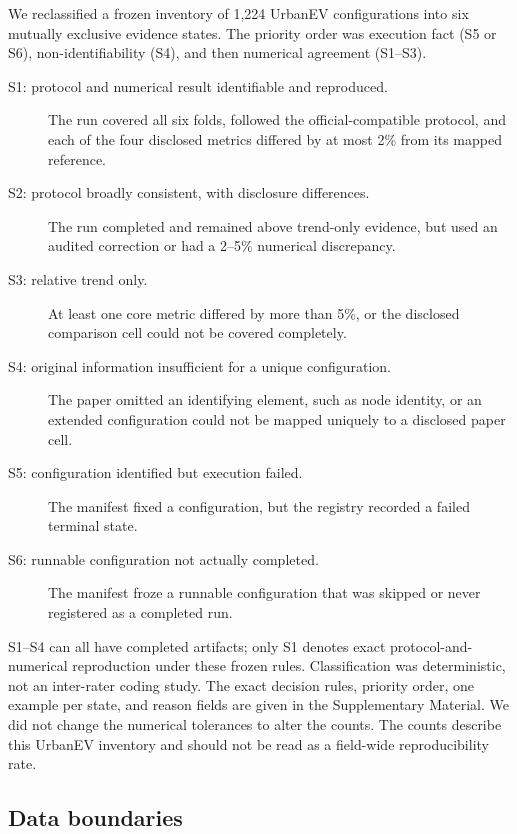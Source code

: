 We reclassified a frozen inventory of 1,224 UrbanEV configurations into six mutually exclusive evidence states.  The priority order was execution fact (S5 or S6), non-identifiability (S4), and then numerical agreement (S1--S3).

\begin{description}
    \item[S1: protocol and numerical result identifiable and reproduced.] The run covered all six folds, followed the official-compatible protocol, and each of the four disclosed metrics differed by at most 2\% from its mapped reference.
    \item[S2: protocol broadly consistent, with disclosure differences.] The run completed and remained above trend-only evidence, but used an audited correction or had a 2--5\% numerical discrepancy.
    \item[S3: relative trend only.] At least one core metric differed by more than 5\%, or the disclosed comparison cell could not be covered completely.
    \item[S4: original information insufficient for a unique configuration.] The paper omitted an identifying element, such as node identity, or an extended configuration could not be mapped uniquely to a disclosed paper cell.
    \item[S5: configuration identified but execution failed.] The manifest fixed a configuration, but the registry recorded a failed terminal state.
    \item[S6: runnable configuration not actually completed.] The manifest froze a runnable configuration that was skipped or never registered as a completed run.
\end{description}

S1--S4 can all have completed artifacts; only S1 denotes exact protocol-and-numerical reproduction under these frozen rules.  Classification was deterministic, not an inter-rater coding study.  The exact decision rules, priority order, one example per state, and reason fields are given in the Supplementary Material.  We did not change the numerical tolerances to alter the counts.  The counts describe this UrbanEV inventory and should not be read as a field-wide reproducibility rate.

\subsection{Data boundaries}
\label{sec:methods-data}

